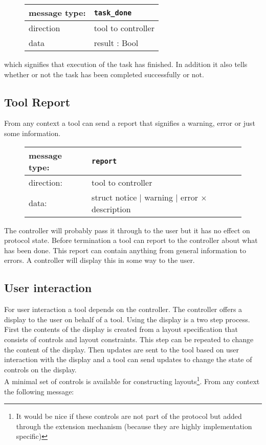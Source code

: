 \documentclass{article}
\newcommand{\msg}[1]{\texttt{#1}}
\begin{document}
   \begin{figure}[H]
    \begin{tabular}{|ll|}
     \hline
      message type:   & \msg{task\_done} \\
     \hline
      direction       & tool to controller \\
      data            & result : Bool \\
     \hline
    \end{tabular}
   \end{figure}

   \noindent which signifies that execution of the task has finished. In addition it also
   tells whether or not the task has been completed successfully or not.

  \subsection{Tool Report}

   From any context a tool can send a report that signifies a warning, error or
   just some information.

   \begin{figure}[H]
    \begin{tabular}{|ll|}
     \hline
      message type:   & \msg{report} \\
     \hline
      direction:      & tool to controller \\
      data:           & struct notice $|$ warning $|$ error $\times$ description \\
     \hline
    \end{tabular}
   \end{figure}

   \noindent The controller will probably pass it through to the user but
   it has no effect on protocol state. Before termination a tool can report to
   the controller about what has been done. This report can contain anything
   from general information to errors. A controller will display this in some
   way to the user.

  \subsection{User interaction} \label{ss:user_interaction}

   For user interaction a tool depends on the controller. The controller offers
   a display to the user on behalf of a tool. Using the display is a two step
   process. First the contents of the display is created from a layout
   specification that consists of controls and layout constraints. This step
   can be repeated to change the content of the display. Then updates are sent
   to the tool based on user interaction with the display and a tool can send
   updates to change the state of controls on the display.
   \\[4pt]
   A minimal set of controls is available for constructing layouts\footnote{It
   would be nice if these controls are not part of the protocol but added
   through the extension mechanism (because they are highly implementation
   specific)}. From any context the following message:
   
\end{document}
